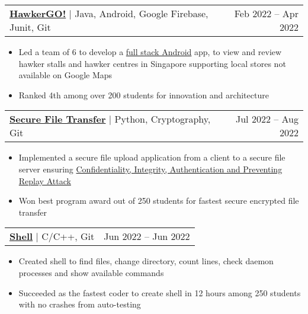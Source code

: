 \documentclass[letterpaper,11pt]{article}
\makeatletter
\newcommand{\resumeItem}[1]{
  \item\small{
    {#1 \vspace{-2.5pt}}
  }
}
\newcommand{\resumeProjectHeading}[2]{
    \item
    \begin{tabular*}{0.97\textwidth}{l@{\extracolsep{\fill}}r}
      \small#1 & \footnotesize#2 \\
    \end{tabular*}\vspace{-7pt}
}
\newcommand{\resumeItemListStart}{\begin{itemize}}
\newcommand{\resumeItemListEnd}{\end{itemize}\vspace{-5pt}}
\makeatother
\begin{document}
          \resumeProjectHeading
           {\href{https://youtu.be/pHnS5BMzTfg} {\faIcon{youtube} }\textbf{{\href{https://github.com/Usgupta/HawkerGO}{\faExternalLink* HawkerGO!}}} $|$ {Java, Android, Google Firebase, Junit, Git}}{\footnotesize	{Feb 2022 -- Apr 2022}}
          
          \resumeItemListStart
            \resumeItem{Led a team of 6 to develop a \ul{full stack Android} app, to view and review hawker stalls and hawker centres in Singapore supporting local stores not available on Google Maps}
            \resumeItem{Ranked 4th among over 200 students for innovation and architecture}
          \resumeItemListEnd

     

                  \resumeProjectHeading
          {\textbf{{\href{https://github.com/Usgupta/pa_2}{\faExternalLink* Secure File Transfer}}} $|$ {Python, Cryptography, Git}}{Jul 2022 -- Aug 2022}
          \resumeItemListStart
          
            \resumeItem{Implemented a secure file upload application from a client to a secure file server ensuring \ul{Confidentiality, Integrity, Authentication and Preventing Replay Attack}}
            \resumeItem{Won best program award out of 250 students for fastest secure encrypted file transfer}
           
          \resumeItemListEnd

        \resumeProjectHeading
          {\textbf{{\href{https://github.com/Usgupta/shell}{\faExternalLink* Shell}}} $|$ {C/C++, Git}}	{Jun 2022 -- Jun 2022}
          \resumeItemListStart
            \resumeItem{Created shell to find files, change directory, count lines, check daemon processes and show available commands}
            \resumeItem{Succeeded as the fastest coder to create shell in 12 hours among 250 students with no crashes from auto-testing}
          \resumeItemListEnd
          

    
      
\end{document}
